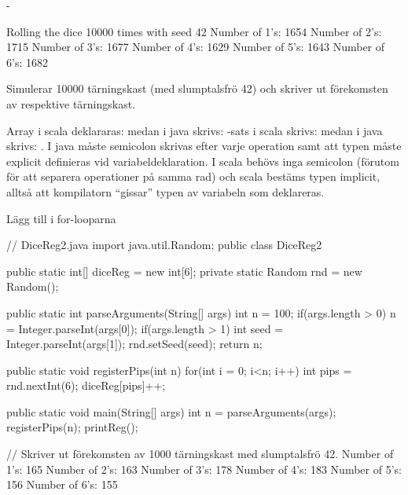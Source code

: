 {


\Task %

\Subtask -

\Subtask \begin{REPL}
Rolling the dice 10000 times with seed 42
Number of 1's: 1654
Number of 2's: 1715
Number of 3's: 1677
Number of 4's: 1629
Number of 5's: 1643
Number of 6's: 1682
\end{REPL}
Simulerar 10000 tärningskast (med slumptalsfrö 42) och skriver ut förekomsten av respektive tärningskast.

\Subtask Array i scala deklararas:  medan i java skrivs: 
-sats i scala skrivs:  medan i java skrivs: . 
I java måste semicolon skrivas efter varje operation samt att typen måste explicit definieras vid variabeldeklaration. 
I scala behövs inga semicolon (förutom för att separera operationer på samma rad) och scala bestäms typen implicit, alltså att kompilatorn “gissar” typen av variabeln som deklareras.

\Subtask Lägg till  i for-looparna

\Subtask \begin{Code}[language=Java] 
// DiceReg2.java
import java.util.Random;
public class DiceReg2{
	public static int[] diceReg = new int[6];
	private static Random rnd = new Random();
	
	public static int parseArguments(String[] args){
		int n = 100;
		if(args.length > 0) {
			n = Integer.parseInt(args[0]);
		}
		if(args.length > 1) {
			int seed = Integer.parseInt(args[1]);
			rnd.setSeed(seed);
		}
		return n;
	}
	
	public static void registerPips(int n) {
		for(int i = 0; i<n; i++) {
			int pips = rnd.nextInt(6);
			diceReg[pips]++;
		}
	}
	
	public static void main(String[] args) {
		int n = parseArguments(args);
		registerPips(n);
		printReg();
	}
}
\end{Code}

\Subtask \begin{REPL} 
  // Skriver ut förekomsten av 1000 tärningskast med slumptalsfrö 42.
Number of 1's: 165
Number of 2's: 163
Number of 3's: 178
Number of 4's: 183
Number of 5's: 156
Number of 6's: 155


\end{REPL}}
